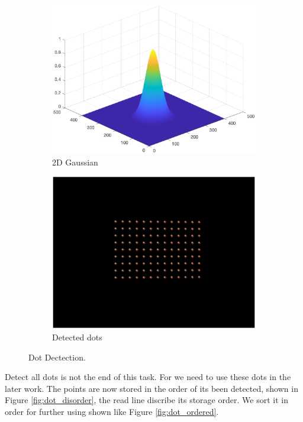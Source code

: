 \begin{figure}[h!]
	\centering
	\begin{subfigure}[t]{0.45\linewidth}
		\centering
		\includegraphics[width=1\linewidth]{figures/part2/gaussian_dis.eps}
		\caption{2D Gaussian}
		\label{fig:gaussian_dis}
	\end{subfigure}
	\begin{subfigure}[t]{0.45\linewidth}
		\centering
		\includegraphics[width=1\linewidth]{figures/part2/dot_detect.eps}
		\caption{Detected dots }
		\label{fig:dot_detect}
	\end{subfigure}
	\caption{Dot Dectection.}
\end{figure}

Detect all dots is not the end of this task. For we need to use these dots in the later work. The points are now stored in the order of its been detected, shown in Figure \ref{fig:dot_disorder}, the read line discribe its storage order. We sort it in order for further using shown like Figure \ref{fig:dot_ordered}.

